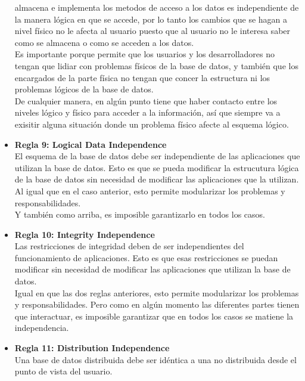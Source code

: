 \documentclass{article}
\begin{document}
\begin{itemize}
        almacena e implementa los metodos de acceso a los datos es independiente 
        de la manera lógica en que se accede, por lo tanto los cambios que se 
        hagan a nivel físico no le afecta al usuario puesto que al usuario no le 
        interesa saber como se almacena o como se acceden a los datos. \\
        Es importante porque permite que los usuarios y los desarrolladores no
        tengan que lidiar con problemas físicos de la base de datos, y también
        que los encargados de la parte física no tengan que concer la estructura
        ni los problemas lógicos de la base de datos.\\
        De cualquier manera, en algún punto tiene que haber contacto entre los 
        niveles lógico y físico para acceder a la información, así que siempre
        va a exisitir alguna situación donde un problema físico afecte al esquema
        lógico.
    	\item\textbf{Regla 9: Logical Data Independence}\\
        El esquema de la base de datos debe ser independiente de las aplicaciones
        que utilizan la base de datos. Esto es que se pueda modificar la estrucutura
        lógica de la base de datos sin necesidad de modificar las aplicaciones que
        la utilizan.\\
        Al igual que en el caso anterior, esto permite modularizar los problemas
        y responsabilidades.\\
        Y también como arriba, es imposible garantizarlo en todos los casos.
    	\item\textbf{Regla 10: Integrity Independence}\\
        Las restricciones de integridad deben de ser independientes del 
        funcionamiento de aplicaciones. Esto es que esas restricciones se puedan
        modificar sin necesidad de modificar las aplicaciones que utilizan la 
        base de datos. \\
        Igual en que las dos reglas anteriores, esto permite modularizar los
        problemas y responsabilidades. Pero como en algún momento las diferentes
        partes tienen que interactuar, es imposible garantizar que en todos los 
        casos se matiene la independencia.
    	\item\textbf{Regla 11: Distribution Independence}\\
        Una base de datos distribuida debe ser idéntica a una no distribuida 
        desde el punto de vista del usuario.\\

\end{itemize}
\end{document}
